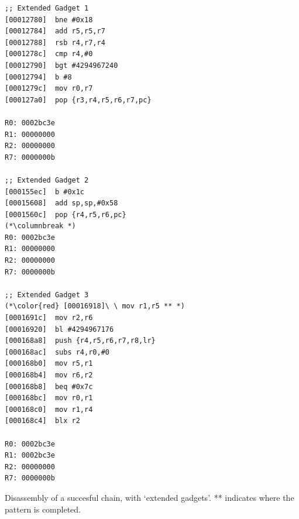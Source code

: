 \begin{table}
\begin{multicols}{5}
\begin{lstlisting}
;; Extended Gadget 1
[00012780]  bne #0x18
[00012784]  add r5,r5,r7
[00012788]  rsb r4,r7,r4
[0001278c]  cmp r4,#0
[00012790]  bgt #4294967240
[00012794]  b #8
[0001279c]  mov r0,r7
[000127a0]  pop {r3,r4,r5,r6,r7,pc}

R0: 0002bc3e
R1: 00000000
R2: 00000000
R7: 0000000b

;; Extended Gadget 2
[000155ec]  b #0x1c
[00015608]  add sp,sp,#0x58
[0001560c]  pop {r4,r5,r6,pc}
(*\columnbreak *)
R0: 0002bc3e
R1: 00000000
R2: 00000000
R7: 0000000b

;; Extended Gadget 3
(*\color{red} [00016918]\ \ mov r1,r5 ** *)
[0001691c]  mov r2,r6
[00016920]  bl #4294967176
[000168a8]  push {r4,r5,r6,r7,r8,lr}
[000168ac]  subs r4,r0,#0
[000168b0]  mov r5,r1
[000168b4]  mov r6,r2
[000168b8]  beq #0x7c
[000168bc]  mov r0,r1
[000168c0]  mov r1,r4
[000168c4]  blx r2

R0: 0002bc3e
R1: 0002bc3e
R2: 00000000
R7: 0000000b
\end{lstlisting}
\end{multicols}
\caption{Disassembly of a succesful chain, with `extended gadgets'. ** indicates where the pattern is completed. }\label{tbl:gadget}
\end{table}%



